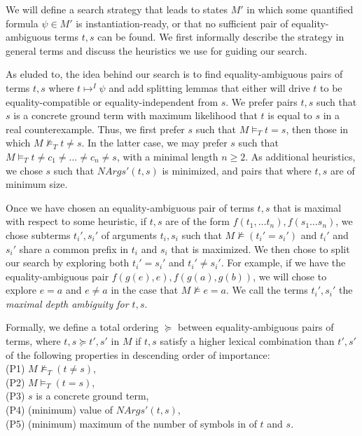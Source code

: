 \documentclass{llncs}
\begin{document}
We will define a search strategy that leads to states $M'$ in which some quantified formula $\psi \in M'$ is instantiation-ready, or that no sufficient pair of equality-ambiguous terms $t, s$ can be found.
We first informally describe the strategy in general terms and discuss the heuristics we use for guiding our search.

As eluded to, the idea behind our search is to find equality-ambiguous pairs of terms $t, s$ where $t \mapsto^I \psi$ and add splitting lemmas that either will drive $t$ to be equality-compatible or equality-independent from $s$.
We prefer pairs $t, s$ such that $s$ is a concrete ground term with maximum likelihood that $t$ is equal to $s$ in a real counterexample.
Thus, we first prefer $s$ such that $M \models_T t = s$, then those in which $M \not\models_T t \neq s$.
In the latter case, we may prefer $s$ such that $M \models_T t \neq c_1 \neq \ldots \neq c_n \neq s$, with a minimal length $n \geq 2$.
As additional heuristics, we chose $s$ such that $NArgs'( t, s )$ is minimized, and pairs that where $t, s$ are of minimum size.

Once we have chosen an equality-ambiguous pair of terms $t,s$ that is maximal with respect to some heuristic, if $t, s$ are of the form $f( t_1, \ldots t_n ), f( s_1 \ldots s_n)$, we chose subterms $t_i', s_i'$ of arguments $t_i, s_i$ such that $M \not\models ( t_i' = s_i' )$ and $t_i'$ and $s_i'$ share a common prefix in $t_i$ and $s_i$ that is maximized.
We then chose to split our search by exploring both $t_i' = s_i'$ and $t_i' \neq s_i'$.
For example, if we have the equality-ambiguous pair $f( g( e ), e ), f( g( a ), g( b ) )$, we will chose to explore $e = a$ and $e \neq a$ in the case that $M \not\models e = a$.
We call the terms $t_i', s_i'$ the \emph{maximal depth ambiguity for $t, s$}.

Formally, we define a total ordering $\succeq$ between equality-ambiguous pairs of terms, where $t,s \succeq t',s'$ in $M$ if $t,s$ satisfy a higher lexical combination than $t',s'$ of the following properties in descending order of importance:  \\
(P1) $M \not\models_T (t \neq s)$, \\
(P2) $M \models_T (t = s)$, \\
(P3) $s$ is a concrete ground term, \\
(P4) (minimum) value of $NArgs'( t, s )$, \\
(P5) (minimum) maximum of the number of symbols in of $t$ and $s$. \\
\end{document}
